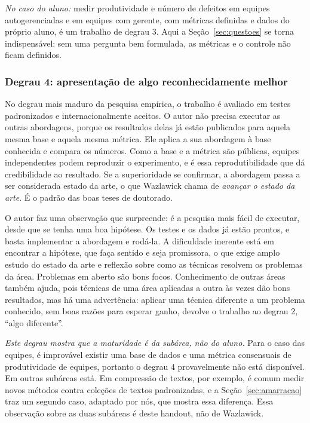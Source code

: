 \documentclass[10pt,a4paper]{extarticle}
\theoremstyle{definition}
\begin{document}
\emph{No caso do aluno:} medir produtividade e número de defeitos em equipes autogerenciadas e em equipes com gerente, com métricas definidas e dados do próprio aluno, é um trabalho de degrau 3. Aqui a Seção~\ref{sec:questoes} se torna indispensável: sem uma pergunta bem formulada, as métricas e o controle não ficam definidos.

\subsubsection*{Degrau 4: apresentação de algo reconhecidamente melhor}

No degrau mais maduro da pesquisa empírica, o trabalho é avaliado em testes padronizados e internacionalmente aceitos. O autor não precisa executar as outras abordagens, porque os resultados delas já estão publicados para aquela mesma base e aquela mesma métrica. Ele aplica a sua abordagem à base conhecida e compara os números. Como a base e a métrica são públicas, equipes independentes podem reproduzir o experimento, e é essa reprodutibilidade que dá credibilidade ao resultado. Se a superioridade se confirmar, a abordagem passa a ser considerada estado da arte, o que Wazlawick chama de \emph{avançar o estado da arte}. É o padrão das boas teses de doutorado.

O autor faz uma observação que surpreende: é a pesquisa mais fácil de executar, desde que se tenha uma boa hipótese. Os testes e os dados já estão prontos, e basta implementar a abordagem e rodá-la. A dificuldade inerente está em encontrar a hipótese, que faça sentido e seja promissora, o que exige amplo estudo do estado da arte e reflexão sobre como as técnicas resolvem os problemas da área. Problemas em aberto são bons focos. Conhecimento de outras áreas também ajuda, pois técnicas de uma área aplicadas a outra às vezes dão bons resultados, mas há uma advertência: aplicar uma técnica diferente a um problema conhecido, sem boas razões para esperar ganho, devolve o trabalho ao degrau 2, \enquote{algo diferente}.

\emph{Este degrau mostra que a maturidade é da subárea, não do aluno.} Para o caso das equipes, é improvável existir uma base de dados e uma métrica consensuais de produtividade de equipes, portanto o degrau 4 provavelmente não está disponível. Em outras subáreas está. Em compressão de textos, por exemplo, é comum medir novos métodos contra coleções de textos padronizadas, e a Seção~\ref{sec:amarracao} traz um segundo caso, adaptado por nós, que mostra essa diferença. Essa observação sobre as duas subáreas é deste handout, não de Wazlawick.
\end{document}
